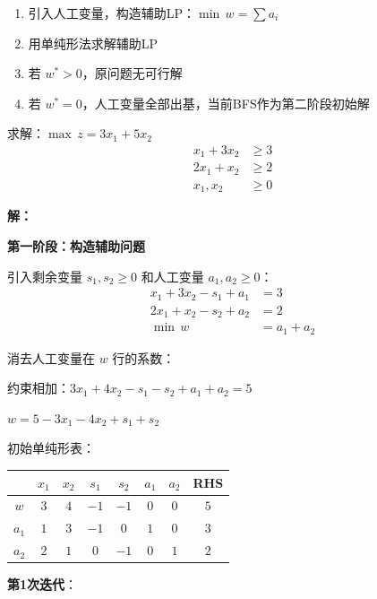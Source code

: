 \begin{algobox}[第一阶段算法]
\begin{enumerate}
    \item 引入人工变量，构造辅助LP：$\min \, w = \sum a_i$
    \item 用单纯形法求解辅助LP
    \item 若 $w^* > 0$，原问题无可行解
    \item 若 $w^* = 0$，人工变量全部出基，当前BFS作为第二阶段初始解
\end{enumerate}
\end{algobox}

\begin{example}
求解：$\max \, z = 3x_1 + 5x_2$
\begin{align*}
x_1 + 3x_2 &\geq 3 \\
2x_1 + x_2 &\geq 2 \\
x_1, x_2 &\geq 0
\end{align*}

\textbf{解：}

\textbf{第一阶段：构造辅助问题}

引入剩余变量 $s_1, s_2 \geq 0$ 和人工变量 $a_1, a_2 \geq 0$：
\begin{align*}
x_1 + 3x_2 - s_1 + a_1 &= 3 \\
2x_1 + x_2 - s_2 + a_2 &= 2 \\
\min \, w &= a_1 + a_2
\end{align*}

消去人工变量在 $w$ 行的系数：

约束相加：$3x_1 + 4x_2 - s_1 - s_2 + a_1 + a_2 = 5$

$w = 5 - 3x_1 - 4x_2 + s_1 + s_2$

初始单纯形表：

\begin{table}[H]
\centering
\begin{tabular}{@{}c|cccccc|c@{}}
\toprule
& $x_1$ & $x_2$ & $s_1$ & $s_2$ & $a_1$ & $a_2$ & RHS \\
\midrule
$w$ & $3$ & $4$ & $-1$ & $-1$ & $0$ & $0$ & $5$ \\
\midrule
$a_1$ & $1$ & $3$ & $-1$ & $0$ & $1$ & $0$ & $3$ \\
$a_2$ & $2$ & $1$ & $0$ & $-1$ & $0$ & $1$ & $2$ \\
\bottomrule
\end{tabular}
\end{table}

\textbf{第1次迭代}：


\end{example}
